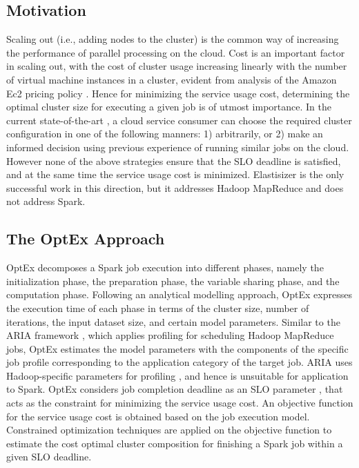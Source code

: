 \documentclass[conference]{IEEEtran}
\begin{document}
 \subsection{Motivation}\label{sec:costcase}Scaling out (i.e., adding nodes
to the cluster) \cite{Herodotou:2011:NOS:2038916.2038934} is the common way of increasing the performance of  parallel processing on the cloud. Cost is an important factor in scaling out, with the cost of cluster usage increasing linearly with the number of virtual machine instances in a cluster, evident from analysis of the Amazon Ec2 pricing policy \cite{inc_amazon_2008}. Hence for minimizing the service usage cost, determining the optimal cluster size for executing a given job is of utmost importance. In the current state-of-the-art \cite{daniel2011prediction, Imai:2013:ARP:2588611.2588688, singer2010towards}, a cloud service consumer can choose the required cluster configuration in one of the following manners: 1) arbitrarily, or 2) make an informed decision using previous experience of running similar jobs on the cloud. However none of the above strategies ensure that the SLO deadline is satisfied, and at the same time the service usage cost is minimized. Elastisizer \cite{Herodotou:2011:NOS:2038916.2038934} is the only successful work in this direction, but it addresses Hadoop MapReduce and does not address Spark. 
 \subsection{The OptEx Approach}\label{sec:modelapproach}
OptEx decomposes a Spark job execution into different phases, namely
 the initialization phase, the preparation phase, the variable sharing phase, and the computation phase.
 Following an analytical modelling approach, OptEx expresses the execution time of each phase in terms of the cluster size, number of iterations, the input dataset size, and certain model parameters. Similar to the ARIA framework \cite{Verma:2011:AAR:1998582.1998637}, which applies profiling for scheduling Hadoop MapReduce jobs, OptEx estimates the model parameters with the components of the specific job
 profile corresponding to the application category  of the target job. ARIA uses Hadoop-specific parameters for profiling \cite{Verma:2011:AAR:1998582.1998637}, and hence is unsuitable for application to Spark.
OptEx considers job completion deadline as an SLO parameter \cite{Chi:2011:IIC:2002938.2002942, Zhang:2011:TCS:2095686.2095687}, that acts as the constraint for minimizing the service usage cost. An objective function for the service usage cost is obtained based on the job execution model. Constrained optimization techniques \cite{leader2004numerical} are applied on the objective
   function to estimate the cost optimal cluster composition for finishing a Spark job within a given SLO deadline.
\end{document}
